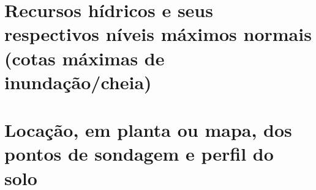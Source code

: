 \chapter{Recursos hídricos e seus respectivos níveis máximos normais (cotas máximas de inundação/cheia)}
\label{chap:rechidr}
\clearpage

%



%
%

\chapter{Locação, em planta ou mapa, dos pontos de sondagem e perfil do solo}
\label{chap:sondagens}
\clearpage








%
%
%
%
%
%
%
%
%
%
%
%



